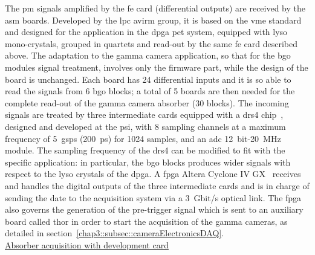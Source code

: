 The \gls{pm} signals amplified by the \gls{fe} card (differential outputs) are received by the \gls{asm} boards. Developed by the \gls{lpc} \gls{avirm} group, it is based on the \gls{vme} standard and designed for the application in the \gls{dpga} \gls{pet} system, equipped with \gls{lyso} mono-crystals, grouped in quartets and read-out by the same \gls{fe} card described above. The adaptation to the gamma camera application, so that for the \gls{bgo} modules signal treatment, involves only the firmware part, while the design of the board is unchanged. Each board has 24 differential inputs and it is so able to read the signals from 6 \gls{bgo} blocks; a total of 5 boards are then needed for the complete read-out of the gamma camera absorber (30 blocks). The incoming signals are treated by three intermediate cards  equipped with a \gls{drs}4 chip~\parencite{Ritt2009}, designed and developed at the \gls{psi}, with 8 sampling channels at a maximum frequency of 5~\gls{gsps} (200~ps) for 1024 samples, and an \gls{adc} 12~bit-20~MHz module. The sampling frequency of the \gls{drs}4 can be modified to fit with the specific application: in particular, the \gls{bgo} blocks produces wider signals with respect to the \gls{lyso} crystals of the \gls{dpga}. A \gls{fpga} Altera Cyclone IV GX~\parencite{Altera2016} receives and handles the digital outputs of the three intermediate cards and is in charge of sending the date to the acquisition system via a 3~Gbit/s optical link. The \gls{fpga} also governs the generation of the pre-trigger signal which is sent to an auxiliary board called \gls{thor} in order to start the acquisition of the gamma cameras, as detailed in section~\ref{chap3::subsec::cameraElectronicsDAQ}.\\

\underline{Absorber acquisition with development card} \\

